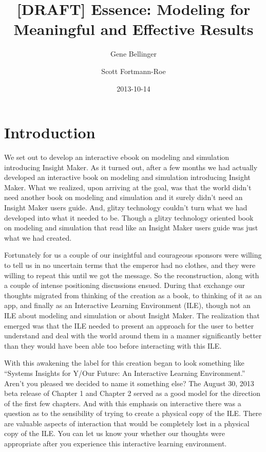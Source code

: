 \documentclass[]{memoir}
\title{{[}DRAFT{]} Essence: Modeling for Meaningful and Effective Results}
\author{Gene Bellinger \and Scott Fortmann-Roe}
\date{2013-10-14}
\begin{document}
\maketitle

{
\hypersetup{linkcolor=black}
\setcounter{tocdepth}{1}
\tableofcontents
}
\section{Introduction}

We set out to develop an interactive ebook on modeling and simulation
introducing Insight Maker. As it turned out, after a few months we had
actually developed an interactive book on modeling and simulation
introducing Insight Maker. What we realized, upon arriving at the goal,
was that the world didn't need another book on modeling and simulation
and it surely didn't need an Insight Maker users guide. And, glitzy
technology couldn't turn what we had developed into what it needed to
be. Though a glitzy technology oriented book on modeling and simulation
that read like an Insight Maker users guide was just what we had
created.

Fortunately for us a couple of our insightful and courageous sponsors
were willing to tell us in no uncertain terms that the emperor had no
clothes, and they were willing to repeat this until we got the message.
So the reconstruction, along with a couple of intense positioning
discussions ensued. During that exchange our thoughts migrated from
thinking of the creation as a book, to thinking of it as an app, and
finally as an Interactive Learning Environment (ILE), though not an ILE
about modeling and simulation or about Insight Maker. The realization
that emerged was that the ILE needed to present an approach for the user
to better understand and deal with the world around them in a manner
significantly better than they would have been able too before
interacting with this ILE.

With this awakening the label for this creation began to look something
like ``Systems Insights for Y/Our Future: An Interactive Learning
Environment.'' Aren't you pleased we decided to name it something else?
The August 30, 2013 beta release of Chapter 1 and Chapter 2 served as a
good model for the direction of the first few chapters. And with this
emphasis on interactive there was a question as to the sensibility of
trying to create a physical copy of the ILE. There are valuable aspects
of interaction that would be completely lost in a physical copy of the
ILE. You can let us know your whether our thoughts were appropriate
after you experience this interactive learning environment.
\end{document}
